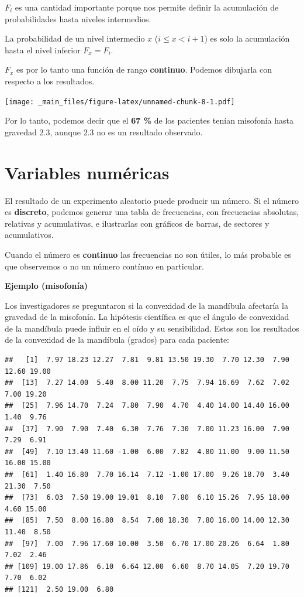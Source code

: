 \documentclass[
]{book}
\begin{document}
\(F_i\) es una cantidad importante porque nos permite definir la acumulación de probabilidades hasta niveles intermedios.

La probabilidad de un nivel intermedio \(x\) (\(i\leq x< i+1\)) es solo la acumulación hasta el nivel inferior \(F_x=F_i\).

\(F_x\) es por lo tanto una función de rango \textbf{continuo}. Podemos dibujarla con respecto a los resultados.

\texttt{[image: \_main\_files/figure-latex/unnamed-chunk-8-1.pdf]}

Por lo tanto, podemos decir que el \textbf{67 \%} de los pacientes tenían misofonía hasta gravedad \(2.3\), aunque \(2.3\) no es un resultado observado.

\hypertarget{variables-numuxe9ricas}{%
\section{Variables numéricas}\label{variables-numuxe9ricas}}

El resultado de un experimento aleatorio puede producir un número. Si el número es \textbf{discreto}, podemos generar una tabla de frecuencias, con frecuencias absolutas, relativas y acumulativas, e ilustrarlas con gráficos de barras, de sectores y acumulativos.

Cuando el número es \textbf{continuo} las frecuencias no son útiles, lo más probable es que observemos o no un número contínuo en particular.

\textbf{Ejemplo (misofonía)}

Los investigadores se preguntaron si la convexidad de la mandíbula afectaría la gravedad de la misofonía. La hipótesis científica es que el ángulo de convexidad de la mandíbula puede influir en el oído y su sensibilidad. Estos son los resultados de la convexidad de la mandíbula (grados) para cada paciente:

\begin{verbatim}
##   [1]  7.97 18.23 12.27  7.81  9.81 13.50 19.30  7.70 12.30  7.90 12.60 19.00
##  [13]  7.27 14.00  5.40  8.00 11.20  7.75  7.94 16.69  7.62  7.02  7.00 19.20
##  [25]  7.96 14.70  7.24  7.80  7.90  4.70  4.40 14.00 14.40 16.00  1.40  9.76
##  [37]  7.90  7.90  7.40  6.30  7.76  7.30  7.00 11.23 16.00  7.90  7.29  6.91
##  [49]  7.10 13.40 11.60 -1.00  6.00  7.82  4.80 11.00  9.00 11.50 16.00 15.00
##  [61]  1.40 16.80  7.70 16.14  7.12 -1.00 17.00  9.26 18.70  3.40 21.30  7.50
##  [73]  6.03  7.50 19.00 19.01  8.10  7.80  6.10 15.26  7.95 18.00  4.60 15.00
##  [85]  7.50  8.00 16.80  8.54  7.00 18.30  7.80 16.00 14.00 12.30 11.40  8.50
##  [97]  7.00  7.96 17.60 10.00  3.50  6.70 17.00 20.26  6.64  1.80  7.02  2.46
## [109] 19.00 17.86  6.10  6.64 12.00  6.60  8.70 14.05  7.20 19.70  7.70  6.02
## [121]  2.50 19.00  6.80
\end{verbatim}
\end{document}
